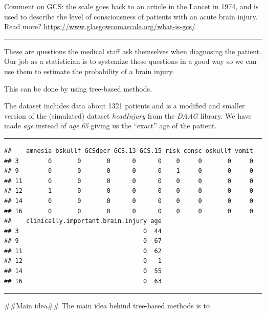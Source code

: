\documentclass[]{article}
\begin{document}
Comment on GCS: the scale goes back to an article in the Lancet in 1974,
and is used to describe the level of consciousness of patients with an
acute brain injury. Read more?
\url{https://www.glasgowcomascale.org/what-is-gcs/}

\begin{center}\rule{0.5\linewidth}{\linethickness}\end{center}

These are questions the medical staff ask themselves when diagnosing the
patient. Our job as a statistician is to systemize these questions in a
good way so we can use them to estimate the probability of a brain
injury.

This can be done by using tree-based methods.

The dataset includes data about 1321 patients and is a modified and
smaller version of the (simulated) dataset \emph{headInjury} from the
\emph{DAAG} library. We have made \emph{age} instead of \emph{age.65}
giving us the ``exact'' age of the patient.

\begin{center}\rule{0.5\linewidth}{\linethickness}\end{center}

\footnotesize

\begin{verbatim}
##    amnesia bskullf GCSdecr GCS.13 GCS.15 risk consc oskullf vomit
## 3        0       0       0      0      0    0     0       0     0
## 9        0       0       0      0      0    1     0       0     0
## 11       0       0       0      0      0    0     0       0     0
## 12       1       0       0      0      0    0     0       0     0
## 14       0       0       0      0      0    0     0       0     0
## 16       0       0       0      0      0    0     0       0     0
##    clinically.important.brain.injury age
## 3                                  0  44
## 9                                  0  67
## 11                                 0  62
## 12                                 0   1
## 14                                 0  55
## 16                                 0  63
\end{verbatim}

\normalsize

\begin{center}\rule{0.5\linewidth}{\linethickness}\end{center}

\#\#Main idea\#\# The main idea behind tree-based methods is to
\end{document}
